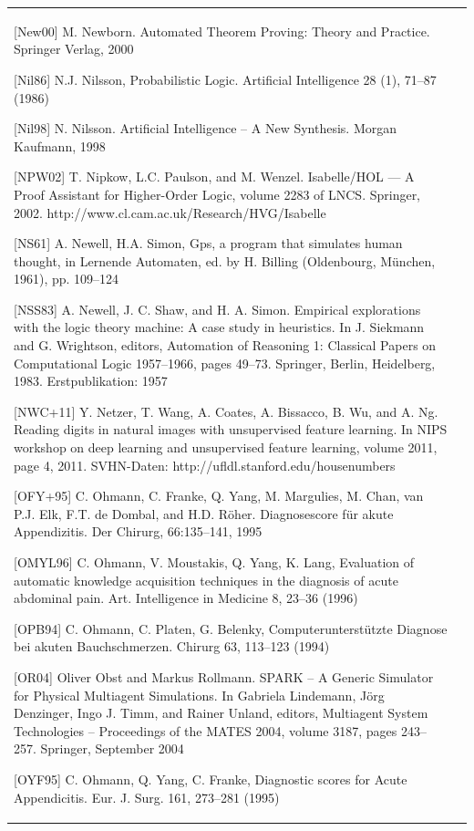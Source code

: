 \documentclass[10pt]{book}
\begin{document}
\begin{center}
\begin{tabular}{|l|l|}
[New00] M. Newborn. Automated Theorem Proving: Theory and Practice. Springer Verlag, 2000

[Nil86] N.J. Nilsson, Probabilistic Logic. Artificial Intelligence 28 (1), 71--87 (1986)

[Nil98] N. Nilsson. Artificial Intelligence -- A New Synthesis. Morgan Kaufmann, 1998

[NPW02] T. Nipkow, L.C. Paulson, and M. Wenzel. Isabelle/HOL --- A Proof Assistant for Higher-Order Logic, volume 2283 of LNCS. Springer, 2002. http://www.cl.cam.ac.uk/Research/HVG/Isabelle

[NS61] A. Newell, H.A. Simon, Gps, a program that simulates human thought, in Lernende Automaten, ed. by H. Billing (Oldenbourg, M\"unchen, 1961), pp. 109--124

[NSS83] A. Newell, J. C. Shaw, and H. A. Simon. Empirical explorations with the logic theory machine: A case study in heuristics. In J. Siekmann and G. Wrightson, editors, Automation of Reasoning 1: Classical Papers on Computational Logic 1957--1966, pages 49--73. Springer, Berlin, Heidelberg, 1983. Erstpublikation: 1957

[NWC+11] Y. Netzer, T. Wang, A. Coates, A. Bissacco, B. Wu, and A. Ng. Reading digits in natural images with unsupervised feature learning. In NIPS workshop on deep learning and unsupervised feature learning, volume 2011, page 4, 2011. SVHN-Daten: http://ufldl.stanford.edu/housenumbers

[OFY+95] C. Ohmann, C. Franke, Q. Yang, M. Margulies, M. Chan, van P.J. Elk, F.T. de Dombal, and H.D. R\"oher. Diagnosescore f\"ur akute Appendizitis. Der Chirurg, 66:135--141, 1995

[OMYL96] C. Ohmann, V. Moustakis, Q. Yang, K. Lang, Evaluation of automatic knowledge acquisition techniques in the diagnosis of acute abdominal pain. Art. Intelligence in Medicine 8, 23--36 (1996)

[OPB94] C. Ohmann, C. Platen, G. Belenky, Computerunterst\"utzte Diagnose bei akuten Bauchschmerzen. Chirurg 63, 113--123 (1994)

[OR04] Oliver Obst and Markus Rollmann. SPARK -- A Generic Simulator for Physical Multiagent Simulations. In Gabriela Lindemann, J\"org Denzinger, Ingo J. Timm, and Rainer Unland, editors, Multiagent System Technologies -- Proceedings of the MATES 2004, volume 3187, pages 243--257. Springer, September 2004

[OYF95] C. Ohmann, Q. Yang, C. Franke, Diagnostic scores for Acute Appendicitis. Eur. J. Surg. 161, 273--281 (1995)


\end{tabular}
\end{center}
\end{document}
